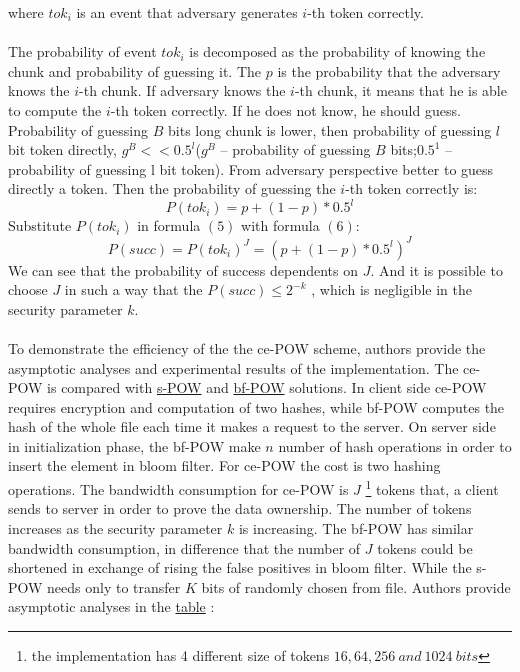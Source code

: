 \documentclass[12pt]{article}
\begin{document}
where $tok_i$ is an event that  adversary generates $i$-th token correctly.\\\\
The probability of event $tok_i$ is decomposed as the probability of knowing the chunk and probability of guessing it. The $p$ is the probability that the adversary knows the $i$-th chunk.  If adversary knows the $i$-th chunk, it means that he is able to compute the $i$-th token correctly. If he does not know, he should guess. Probability of guessing $B$ bits long chunk is lower, then probability of guessing $l$ bit token directly, $g^B << 0.5^l$($g^B$ -- probability of guessing $B$ bits;$0.5^1$ -- probability of guessing l bit token). From adversary perspective better to guess directly a token. Then the probability of guessing the $i$-th token correctly is: 
\begin{equation}\label{2}
 P(tok_i)=p+(1-p)*0.5^l
\end{equation}
Substitute $P(tok_i)$ in  formula $(5)$ with  formula $(6)$: 
\begin{equation}\label{3}
P(succ) = P(tok_i)^J = (p+(1-p)*0.5^l)^J
\end{equation}
We can see that the probability of success dependents on $J$. And it is possible to choose $J$ in such a way that the $P(succ) \leq 2^{-k}$ , which is negligible in the security parameter $k$.\\\\
To demonstrate the efficiency of the the ce-POW scheme, authors provide the asymptotic  analyses and experimental results of the implementation. The ce-POW is compared with \hyperref[sub:Soltuion2]{s-POW} and \hyperref[sub:Soltuion6]{bf-POW} solutions. In client side ce-POW requires encryption and computation of two hashes, while bf-POW computes the hash of the whole file each time it makes a request to the server. On server side  in initialization phase, the bf-POW make $n$ number of hash operations in order to insert the element in bloom filter. For ce-POW the  cost is  two hashing operations. The bandwidth consumption for ce-POW is $J$ \footnote{ the implementation has 4 different size of tokens $16, 64, 256\ and\  1024\ bits$} tokens that, a client sends to server in order to prove the data ownership. The number of tokens increases as the security parameter $k$ is increasing. The bf-POW has  similar  bandwidth consumption, in difference that the number of $J$ tokens could be  shortened in exchange of rising the false positives in bloom filter. While the s-POW needs only to transfer $K$ bits of randomly chosen from file. Authors provide asymptotic analyses in the \hyperref[table:asymptoticAnalysisCE-POW]{table}  :
\end{document}
